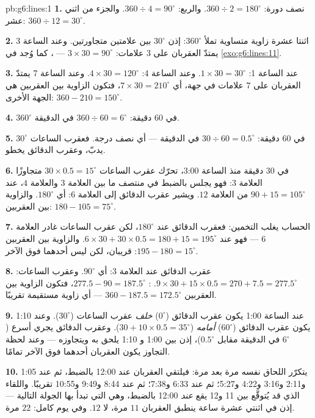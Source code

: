 \begin{solution}{pb:g6:lines:1}
\textbf{1.} نصف دورة: $360 \div 2 = 180^\circ$. والربع:
$360 \div 4 = 90^\circ$. والجزء من اثني عشر: $360 \div 12 = 30^\circ$.

\textbf{2.} اثنتا عشرة زاوية متساوية تملأ $360^\circ$:
إذن $30^\circ$ بين علامتين متجاورتين. وعند الساعة 3 يمتدّ
العقربان على $3$ علامات: $3 \times 30 = 90^\circ$ --- ، كما
وُجد في \cref{exo:g6:lines:11}.

\textbf{3.} عند الساعة 1: $1 \times 30 = 30^\circ$. وعند
الساعة 4: $4 \times 30 = 120^\circ$. وعند الساعة 7 يمتدّ العقربان
على $7$ علامات في جهة، أي $7 \times 30 = 210^\circ$، فتكون
الزاوية بين العقربين هي الجهة الأخرى:
$360 - 210 = 150^\circ$.

\textbf{4.} $360^\circ$ في $60$ دقيقة: $360 \div 60 =
6^\circ$ في الدقيقة.

\textbf{5.} $30^\circ$ في $60$ دقيقة: $30 \div 60 = 0.5^\circ$
في الدقيقة --- أي نصف درجة. فعقرب الساعات يدبّ، وعقرب
الدقائق يخطو.

\textbf{6.} في $30$ دقيقة منذ الساعة 3:00، تحرّك عقرب الساعات
$30 \times 0.5 = 15^\circ$ متجاوزًا العلامة $3$: فهو يجلس بالضبط
في منتصف ما بين العلامة $3$ والعلامة $4$، عند $90 + 15 = 105^\circ$
من العلامة $12$. ويشير عقرب الدقائق إلى العلامة $6$:
أي $180^\circ$. والزاوية بين العقربين:
$180 - 105 = 75^\circ$.

\textbf{7.} الحساب يغلب التخمين: فعقرب الدقائق عند
$180^\circ$، لكن عقرب الساعات غادر العلامة $6$ --- فهو عند
$6 \times 30 + 30 \times 0.5 = 180 + 15 = 195^\circ$. والزاوية
بين العقربين $195 - 180 = 15^\circ$: قريبان، لكن ليس أحدهما
فوق الآخر.

\textbf{8.} عقرب الدقائق عند العلامة $3$: أي $90^\circ$. وعقرب الساعات:
$9 \times 30 + 15 \times 0.5 = 270 + 7.5 = 277.5^\circ$.
: $277.5 - 90 = 187.5^\circ$، فتكون الزاوية بين
العقربين $360 - 187.5 = 172.5^\circ$ --- أي زاوية مستقيمة
تقريبًا.

\textbf{9.} عند الساعة 1:00 يكون عقرب الدقائق ($0^\circ$) \emph{خلف}
عقرب الساعات ($30^\circ$). وعند 1:10 يكون عقرب الدقائق
($60^\circ$) \emph{أمامه}
($30 + 10 \times 0.5 = 35^\circ$). وعقرب الدقائق يجري أسرع
($6^\circ$ في الدقيقة مقابل $0.5^\circ$)، إذن بين 1:00 و
1:10 يلحق به ويتجاوزه --- وعند لحظة
التجاوز يكون العقربان أحدهما فوق الآخر تمامًا.

\textbf{10.} يتكرّر اللحاق نفسه مرة بعد مرة: فيلتقي
العقربان عند 12:00 بالضبط، ثم عند 1:05 و2:11 و3:16
و4:22 و5:27؛ ثم عند 6:33 و7:38؛ ثم عند 8:44 و9:49
و10:55 تقريبًا. واللقاء الذي
قد يُتوقَّع بين 11 و12 يقع \emph{عند} 12:00 بالضبط،
وهي التي تبدأ بها الجولة التالية --- إذن في اثنتي عشرة ساعة
ينطبق العقربان $11$ مرة، لا $12$. وفي يوم كامل: $22$ مرة.


\end{solution}
